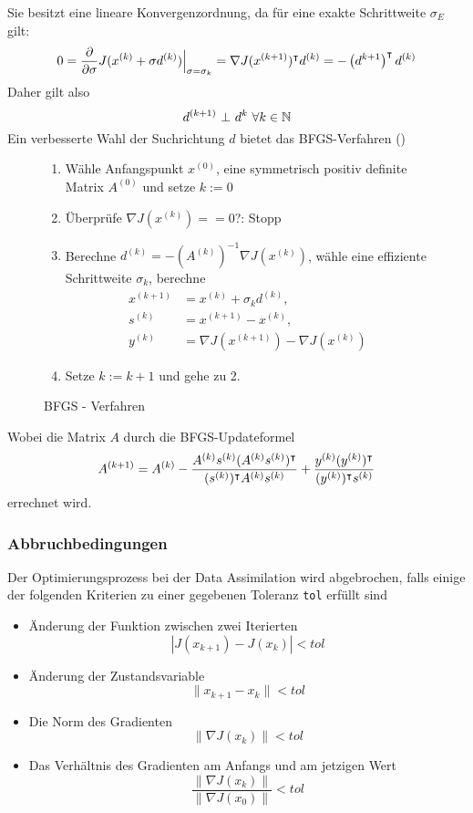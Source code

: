 Sie besitzt eine lineare Konvergenzordnung, da für eine exakte Schrittweite $\sigma_E$ gilt:
\[
 0 = \frac{\partial }{\partial \sigma} J(x^{(k)} + \sigma d^{(k)}) \Big|_{\sigma = \sigma_k} = \nabla J(x^{(k+1)})^\intercal d^{(k)} = - \left( d^{k+1}\right)^\intercal d^{(k)}
\]
Daher gilt also
\[
 d^{(k+1)}~\bot ~d^{k} ~ \forall k \in \mathbb{N}
\]
Ein verbesserte Wahl der Suchrichtung $d$ bietet das BFGS-Verfahren (\cite[Verfahren 4.8.11]{alt2002nichtlineare})
\begin{figure}[H]
\begin{framed}
\begin{enumerate}
 \item Wähle Anfangspunkt $x^{(0)}$, eine symmetrisch positiv definite Matrix $A^{(0)}$ und setze $k:=0$
 \item Überprüfe $\nabla J(x^{(k)}) == 0$?: Stopp
 \item Berechne $d^{(k)} = -\left( A^{(k)} \right)^{-1} \nabla J(x^{(k)})$, wähle eine effiziente Schrittweite $\sigma_k$, berechne 
 \[
 \begin{aligned}
  x^{(k+1)} &= x^{(k)} + \sigma_k d^{(k)}, \\ s^{(k)} &= x^{(k+1)} - x^{(k)},\\ y^{(k)} &= \nabla J(x^{(k+1)})- \nabla J(x^{(k)})
 \end{aligned}
 \]
 \item Setze $k:= k+1$ und gehe zu 2.
\end{enumerate} 
\end{framed}
 \caption{BFGS - Verfahren}
 \label{alg:bfgs}
\end{figure}
Wobei die Matrix $A$ durch die BFGS-Updateformel 
\[
 A^{(k+1)} = A^{(k)} - \frac{A^{(k)}s^{(k)}(A^{(k)}s^{(k)})^\intercal}{(s^{(k)})^\intercal A^{(k)}s^{(k)}} + \frac{y^{(k)} (y^{(k)})^\intercal}{(y^{(k)})^\intercal s^{(k)}}
\]
errechnet wird.
\subsubsection{Abbruchbedingungen}
Der Optimierungsprozess bei der Data Assimilation wird abgebrochen, falls einige der folgenden Kriterien zu einer gegebenen Toleranz \texttt{tol} erfüllt sind
\begin{itemize}
 \item Änderung der Funktion zwischen zwei Iterierten
 \[
  |J(x_{k+1}) - J(x_{k})| < tol
 \]
\item Änderung der Zustandsvariable
\[
 \|x_{k+1} - x_{k}\|<tol
\]
\item Die Norm des Gradienten
\[
 \|\nabla J(x_k)\|<tol
\]
\item Das Verhältnis des Gradienten am Anfangs und am jetzigen Wert
\[
 \frac{\|\nabla J(x_k)\| }{\|\nabla J(x_0)\|}<tol
\]


\end{itemize}


